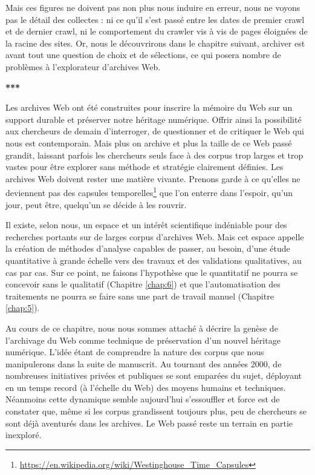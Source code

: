 \documentclass[symmetric,justified,marginals=raggedouter]{tufte-book}
\begin{document}
Mais ces figures ne doivent pas non plus nous induire en erreur, nous ne voyons pas le détail des collectes : ni ce qu'il s'est passé entre les dates de premier crawl et de dernier crawl, ni le comportement du crawler vis à vis de pages éloignées de la racine des sites. Or, nous le découvrirons dans le chapitre suivant, archiver est avant tout une question de choix et de sélections, ce qui posera nombre de problèmes à l'explorateur d'archives Web. 

\begin{center}
	\textbf{***}
\end{center}

\noindent Les archives Web ont été construites pour inscrire la mémoire du Web sur un support durable et préserver notre héritage numérique. Offrir ainsi la possibilité aux chercheurs de demain d'interroger, de questionner et de critiquer le Web qui nous est contemporain. Mais plus on archive et plus la taille de ce Web passé grandit, laissant parfois les chercheurs seuls face à des corpus trop larges et trop vastes pour être explorer sans méthode et stratégie clairement définies. Les archives Web doivent rester une matière vivante. Prenons garde à ce qu'elles ne deviennent pas des capsules temporelles\footnote{\url{https://en.wikipedia.org/wiki/Westinghouse\_Time\_Capsules}} que l'on enterre dans l'espoir, qu'un jour, peut être, quelqu'un se décide à les rouvrir.

Il existe, selon nous, un espace et un intérêt scientifique indéniable pour des recherches portants sur de larges corpus d'archives Web. Mais cet espace appelle la création de méthodes d'analyse capables de passer, au besoin, d'une étude quantitative à grande échelle vers des travaux et des validations qualitatives, au cas par cas. Sur ce point, ne faisons l'hypothèse que le quantitatif ne pourra se concevoir sans le qualitatif (Chapitre \ref{chap:6}) et que l'automatisation des traitements ne pourra se faire sans une part de travail manuel (Chapitre \ref{chap:5}).

Au cours de ce chapitre, nous nous sommes attaché à décrire la genèse de l'archivage du Web comme technique de préservation d'un nouvel héritage numérique. L'idée étant de comprendre la nature des corpus que nous manipulerons dans la suite de manuscrit. Au tournant des années 2000, de nombreuses initiatives privées et publiques se sont emparées du sujet, déployant en un temps record (à l'échelle du Web) des moyens humains et techniques. Néanmoins cette dynamique semble aujourd'hui s'essouffler et force est de constater que, même si les corpus grandissent toujours plus, peu de chercheurs se sont déjà aventurés dans les archives. Le Web passé reste un terrain en partie inexploré. 
\end{document}
